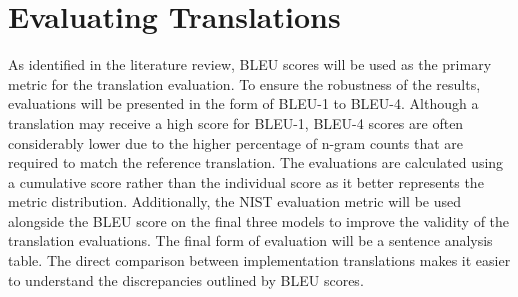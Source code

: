 \section{Evaluating Translations}
\label{sec:3-evaluating}

As identified in the literature review, \acrshort{BLEU} scores will be used as the primary metric for the translation evaluation. To ensure the robustness of the results, evaluations will be presented in the form of \acrshort{BLEU}-1 to \acrshort{BLEU}-4. Although a translation may receive a high score for \acrshort{BLEU}-1, \acrshort{BLEU}-4 scores are often considerably lower due to the higher percentage of n-gram counts that are required to match the reference translation. The evaluations are calculated using a cumulative score rather than the individual score as it better represents the metric distribution. Additionally, the \acrshort{NIST} evaluation metric will be used alongside the \acrshort{BLEU} score on the final three models to improve the validity of the translation evaluations. The final form of evaluation will be a sentence analysis table. The direct comparison between implementation translations makes it easier to understand the discrepancies outlined by \acrshort{BLEU} scores.